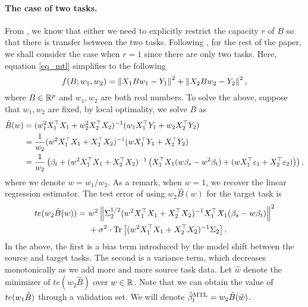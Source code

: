\paragraph{The case of two tasks.}
From \cite{WZR20}, we know that either we need to explicitly restrict the capacity $r$ of $B$ so that there is transfer between the two tasks.
Following \cite{WZR20}, for the rest of the paper, we shall consider the case when $r=1$ since there are only two tasks.
Here, equation \eqref{eq_mtl} simplifies to the following
\[ f(B; w_1, w_2) = \left\| X_1 B w_1 - Y_1 \right\|^2 + \left\| X_2 B w_2 - Y_2 \right\|^2, \]
where $B\in\mathbb{R}^p$ and $w_1, w_2$ are both real numbers.
To solve the above, suppose that $w_1, w_2$ are fixed, by local optimality, we solve $B$ as
\begin{align*}
	\hat{B}(w) &= (w_1^2 X_1^{\top}X_1 + w_2^2 X_2^{\top}X_2)^{-1} (w_1 X_1^{\top}Y_1 + w_2 X_2^{\top}Y_2) \\
	&= \frac{1}{w_2} (w^2 X_1^{\top}X_1 + X_2^{\top}X_2)^{-1} (w X_1^{\top}Y_1 + X_2^{\top}Y_2) \\
	&= \frac{1}{w_2}\left({\beta_t + (w^2 X_1^{\top}X_1 + X_2^{\top}X_2)^{-1}\left({X_1^{\top}X_1(w\beta_s - w^2\beta_t) + (w X_1^{\top}\varepsilon_1 + X_2^{\top}\varepsilon_2)}\right)}\right),
\end{align*}
where we denote $w = w_1 / w_2$.
As a remark, when $w = 1$, we recover the linear regression estimator.
The test error of using $w_2 \hat{B}(w)$ for the target task is
\begin{align}
	te(w_2\hat{B}(w)) =&~ w^2 \left\| \Sigma_2^{1/2}(w^2 X_1^{\top}X_1 + X_2^{\top}X_2)^{-1} X_1^{\top}X_1 (\beta_s - w \beta_t) \right\|^2 \nonumber \\
			&~ + \sigma^2 \cdot \operatorname{Tr}\left[(w^2 X_1^{\top}X_1 + X_2^{\top}X_2)^{-1} \Sigma_2\right]. \label{eq_te_mtl}
\end{align}
In the above, the first is a bias term introduced by the model shift between the source and target tasks.
The second is a variance term, which decreases monotonically as we add more and more source task data.
Let $\hat{w}$ denote the minimizer of $te(w_2 \hat{B})$ over $w\in\mathbb{R}$.
Note that we can obtain the value of $te(w_1\hat{B})$ through a validation set.
We will denote $\hat{\beta}_t^{\text{MTL}} = w_2 \hat{B}(\hat{w})$.

